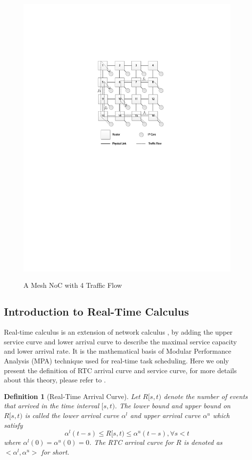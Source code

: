 \documentclass[10pt,journal]{IEEEtran}
\newtheorem{definition}{Definition}
\begin{document}
\begin{figure}
  \centering
  \includegraphics[scale=0.9]{figures/mesh.pdf}\\
  \caption{A Mesh NoC with 4 Traffic Flow}\label{topology}
\end{figure}

\subsection{Introduction to Real-Time Calculus}
Real-time calculus is an extension of network calculus \cite{ThCN00}\cite{1253607}, by adding the upper service curve and lower arrival curve to describe the maximal service capacity and lower arrival rate. It is the mathematical basis of Modular Performance Analysis (MPA) \cite{Wandeler2006System} technique used for real-time task scheduling. Here we only present the definition of RTC arrival curve and service curve, for more details about this theory, please refer to \cite{ThCN00}\cite{1253607}.
\begin{definition}[Real-Time Arrival Curve]
Let $R[s,t)$ denote the number of events that arrived in the time interval $[s,t)$. The lower bound and upper bound on $R[s,t)$ is called the lower arrival curve $\alpha^l$ and upper arrival curve $\alpha^u$ which satisfy
$$\alpha^l(t-s)\leq R[s,t)\leq \alpha^u(t-s),\forall s<t$$
where $\alpha^l(0)=\alpha^u(0)=0$. The RTC arrival curve for $R$ is denoted as $<\alpha^l,\alpha^u>$ for short.
\end{definition}
\end{document}
